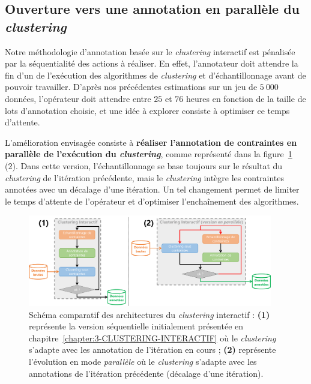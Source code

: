 		\subsection{Ouverture vers une annotation en parallèle du \textit{clustering}}
		
			Notre méthodologie d'annotation basée sur le \textit{clustering} interactif est pénalisée par la séquentialité des actions à réaliser.
			En effet, l'annotateur doit attendre la fin d'un de l'exécution des algorithmes de \textit{clustering} et d'échantillonnage avant de pouvoir travailler.
			D'après nos précédentes estimations sur un jeu de $5~000$ données, l'opérateur doit attendre entre $25$ et $76$ heures en fonction de la taille de lots d'annotation choisie, et une idée à explorer consiste à optimiser ce temps d'attente.
			
			L'amélioration envisagée consiste à \textbf{réaliser l'annotation de contraintes en parallèle de l'exécution du \textit{clustering}}, comme représenté dans la figure~\ref{figure:4.3.4-ETUDE-COUT-TOTAL-ARCHITECTURE} (2).
			Dans cette version, l'échantillonnage se base toujours sur le résultat du \textit{clustering} de l'itération précédente, mais le \textit{clustering} intègre les contraintes annotées avec un décalage d'une itération.
			Un tel changement permet de limiter le temps d'attente de l'opérateur et d'optimiser l’enchaînement des algorithmes.

			\begin{figure}[!htb]
				\centering
				\includegraphics[width=0.95\textwidth]{figures/interactive-clustering-architecture-sequentielle-vs-parallele}
				\caption{Schéma comparatif des architectures du \textit{clustering} interactif : \textbf{(1)} représente la version séquentielle initialement présentée en chapitre~\ref{chapter:3-CLUSTERING-INTERACTIF} où le \textit{clustering} s'adapte avec les annotation de l'itération en cours ; \textbf{(2)} représente l'évolution en mode \textit{parallèle} où le \textit{clustering} s'adapte avec les annotations de l'itération précédente (décalage d'une itération).}
				\label{figure:4.3.4-ETUDE-COUT-TOTAL-ARCHITECTURE}
			\end{figure}
			
